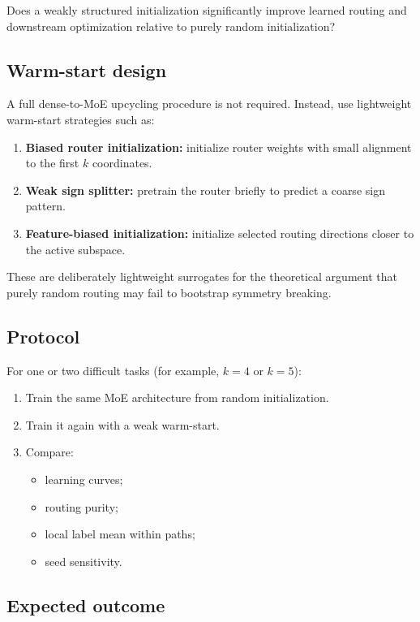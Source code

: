 \documentclass[11pt]{article}
\begin{document}
Does a weakly structured initialization significantly improve learned routing and downstream optimization relative to purely random initialization?

\subsection{Warm-start design}

A full dense-to-MoE upcycling procedure is not required. Instead, use lightweight warm-start strategies such as:
\begin{enumerate}[leftmargin=2em]
    \item \textbf{Biased router initialization:} initialize router weights with small alignment to the first $k$ coordinates.
    \item \textbf{Weak sign splitter:} pretrain the router briefly to predict a coarse sign pattern.
    \item \textbf{Feature-biased initialization:} initialize selected routing directions closer to the active subspace.
\end{enumerate}

These are deliberately lightweight surrogates for the theoretical argument that purely random routing may fail to bootstrap symmetry breaking.

\subsection{Protocol}

For one or two difficult tasks (for example, $k=4$ or $k=5$):
\begin{enumerate}[leftmargin=2em]
    \item Train the same MoE architecture from random initialization.
    \item Train it again with a weak warm-start.
    \item Compare:
    \begin{itemize}
        \item learning curves;
        \item routing purity;
        \item local label mean within paths;
        \item seed sensitivity.
    \end{itemize}
\end{enumerate}

\subsection{Expected outcome}
\end{document}
